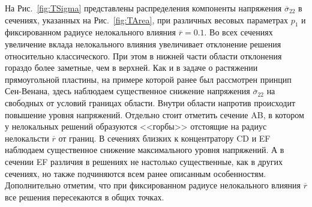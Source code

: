 На Рис.~\ref{fig:TSigma} представлены распределения компоненты напряжения $\overline{\sigma}_{22}$ в сечениях, указанных на Рис.~\ref{fig:TArea}, при различных весовых параметрах $p_1$ и фиксированном радиусе нелокального влияния $\overline{r} = 0.1$. Во всех сечениях увеличение вклада нелокального влияния увеличивает отклонение решения относительно классического. При этом в нижней части области отклонения гораздо более заметные, чем в верхней. Как и в задаче о растяжении прямоугольной пластины, на примере которой ранее был рассмотрен принцип Сен-Венана, здесь наблюдаем существенное снижение напряжения $\overline{\sigma}_{22}$ на свободных от условий границах области. Внутри области напротив происходит повышение уровня напряжений. Отдельно стоит отметить сечение AB, в котором у нелокальных решений образуются <<горбы>> отстоящие на радиус нелокальсти $\overline{r}$ от границ. В сечениях близких к концентратору CD и EF наблюдаем существенное снижение максимального уровня напряжений. А в сечении EF различия в решениях не настолько существенные, как в других сечениях, но также подчиняются всем ранее описанным особенностям. Дополнительно отметим, что при фиксированном радиусе нелокального влияния $\overline{r}$ все решения пересекаются в общих точках.

